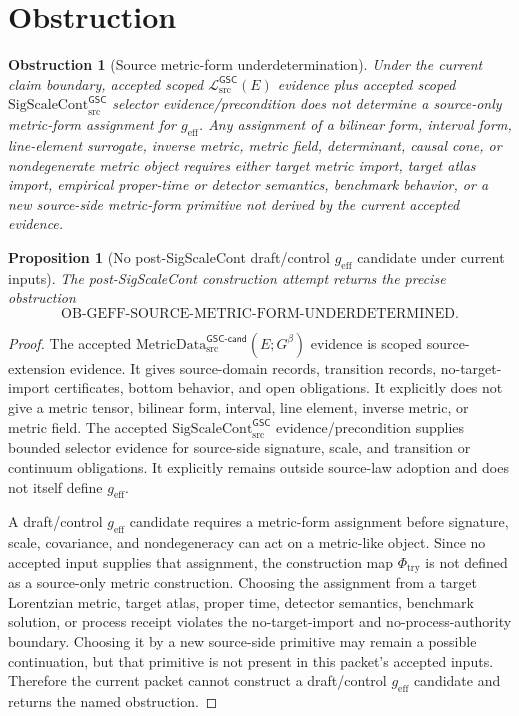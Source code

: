 \documentclass[11pt]{article}
\newcommand{\MetricDataCand}{\mathrm{MetricData}_{\mathrm{src}}^{\mathsf{GSC\mbox{-}cand}}}
\newcommand{\MetricData}{\mathcal{L}_{\mathrm{src}}^{\mathsf{GSC}}}
\newcommand{\Gbeta}{G^{\beta}}
\newcommand{\geff}{g_{\mathrm{eff}}}
\newcommand{\SigScaleCont}{\mathrm{SigScaleCont}_{\mathrm{src}}^{\mathsf{GSC}}}
\newcommand{\ObMetricForm}{\mathrm{OB\mbox{-}GEFF\mbox{-}SOURCE\mbox{-}METRIC\mbox{-}FORM\mbox{-}UNDERDETERMINED}}
\newtheorem{proposition}{Proposition}
\newtheorem{obstruction}{Obstruction}
\begin{document}
\section{Obstruction}

\begin{obstruction}[Source metric-form underdetermination]
\label{ob:geff-source-metric-form}
Under the current claim boundary, accepted scoped \(\MetricData(E)\) evidence
plus accepted scoped \(\SigScaleCont\) selector evidence/precondition does not
determine a source-only metric-form assignment for \(\geff\). Any assignment of
a bilinear form, interval form, line-element surrogate, inverse metric, metric
field, determinant, causal cone, or nondegenerate metric object requires either
target metric import, target atlas import, empirical proper-time or detector
semantics, benchmark behavior, or a new source-side metric-form primitive not
derived by the current accepted evidence.
\end{obstruction}

\begin{proposition}[No post-SigScaleCont draft/control \(\geff\) candidate under current inputs]
The post-SigScaleCont construction attempt returns the precise obstruction
\[
  \ObMetricForm .
\]
\end{proposition}

\begin{proof}
The accepted \(\MetricDataCand(E;\Gbeta)\) evidence is scoped source-extension
evidence. It gives source-domain records, transition records, no-target-import
certificates, bottom behavior, and open obligations. It explicitly does not
give a metric tensor, bilinear form, interval, line element, inverse metric, or
metric field. The accepted \(\SigScaleCont\) evidence/precondition supplies
bounded selector evidence for source-side signature, scale, and transition or
continuum obligations. It explicitly remains outside source-law adoption and
does not itself define \(\geff\).

A draft/control \(\geff\) candidate requires a metric-form assignment before
signature, scale, covariance, and nondegeneracy can act on a metric-like
object. Since no accepted input supplies that assignment, the construction map
\(\Phi_{\mathrm{try}}\) is not defined as a source-only metric construction.
Choosing the assignment from a target Lorentzian metric, target atlas, proper
time, detector semantics, benchmark solution, or process receipt violates the
no-target-import and no-process-authority boundary. Choosing it by a new
source-side primitive may remain a possible continuation, but that primitive
is not present in this packet's accepted inputs. Therefore the current packet
cannot construct a draft/control \(\geff\) candidate and returns the named
obstruction.
\end{proof}
\end{document}
